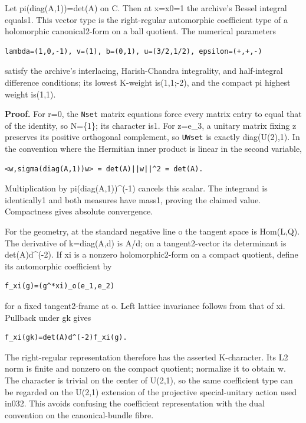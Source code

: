 Let pi(diag(A,1))=det(A) on C. Then at x=x0=1 the archive's Bessel integral equals1. This vector type is the right-regular automorphic coefficient type of a holomorphic canonical2-form on a ball quotient. The numerical parameters

\begin{verbatim}
lambda=(1,0,-1), v=(1), b=(0,1), u=(3/2,1/2), epsilon=(+,+,-)
\end{verbatim}

satisfy the archive's interlacing, Harish-Chandra integrality, and half-integral difference conditions; its lowest K-weight is(1,1;-2), and the compact pi highest weight is(1,1).

\textbf{Proof.} For r=0, the \texttt{Nset} matrix equations force every matrix entry to equal that of the identity, so N=\{1\}; its character is1. For z=e\_3, a unitary matrix fixing z preserves its positive orthogonal complement, so \texttt{UWset} is exactly diag(U(2),1). In the convention where the Hermitian inner product is linear in the second variable,

\begin{verbatim}
<w,sigma(diag(A,1))w> = det(A)||w||^2 = det(A).
\end{verbatim}

Multiplication by pi(diag(A,1))\^{}(-1) cancels this scalar. The integrand is identically1 and both measures have mass1, proving the claimed value. Compactness gives absolute convergence.

For the geometry, at the standard negative line o the tangent space is Hom(L,Q). The derivative of k=diag(A,d) is A/d; on a tangent2-vector its determinant is det(A)d\^{}(-2). If xi is a nonzero holomorphic2-form on a compact quotient, define its automorphic coefficient by

\begin{verbatim}
f_xi(g)=(g^*xi)_o(e_1,e_2)
\end{verbatim}

for a fixed tangent2-frame at o. Left lattice invariance follows from that of xi. Pullback under gk gives

\begin{verbatim}
f_xi(gk)=det(A)d^(-2)f_xi(g).
\end{verbatim}

The right-regular representation therefore has the asserted K-character. Its L2 norm is finite and nonzero on the compact quotient; normalize it to obtain w. The character is trivial on the center of U(2,1), so the same coefficient type can be regarded on the U(2,1) extension of the projective special-unitary action used in032. This avoids confusing the coefficient representation with the dual convention on the canonical-bundle fibre.

